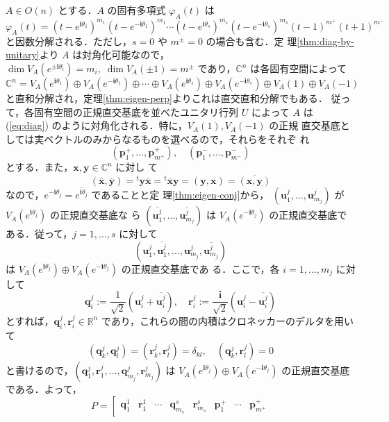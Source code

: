\documentclass[11pt, uplatex, dvipdfmx, titlepage]{jsarticle}
\makeatletter
\renewcommand{\i}{\mathbf{i}}
\renewcommand{\bar}[1]{\overline{#1}}
\renewenvironment{proof}[1][\proofname]{\par
  \pushQED{\qed}%
  \normalfont \topsep6\p@\@plus6\p@\relax
  \trivlist
  \item[\hskip\labelsep
         \bfseries
    {#1}]\ignorespaces
}{%
  \popQED\endtrivlist\@endpefalse
}
\theoremstyle{definition}
\renewcommand{\proofname}{\textbf{証明}}
\makeatother
\begin{document}
\begin{proof}[定理\ref{thm:stdform}の証明]
  $A \in O(n)$ とする．$A$ の固有多項式 $\varphi_A(t)$ は
\[
  \varphi_A(t) =(t-e^{\i
    \theta_1})^{m_1}(t-e^{-\i\theta_1})^{m_1} \cdots (t-e^{\i \theta_s})^{m_s}(t-e^{-\i
    \theta_s})^{m_s}(t-1)^{m^{+}} (t+1)^{m^{-}} 
\]
と因数分解される．ただし，$s=0$ や $m^{\pm}=0$ の場合も含む．定
理\ref{thm:diag-by-unitary}より $A$
は対角化可能なので，$\dim V_A(e^{ \pm \i
  \theta_i}) = m_i, \; \dim V_A(\pm 1) = m^{\pm}$ であり，$\mathbb{C}^{n}$ は各固有空間によって
\[
  \mathbb{C}^n = V_A(e^{\i \theta_1}) \oplus  V_A(e^{-\i\theta_1}) \oplus \cdots \oplus
  V_A(e^{\i\theta_s}) \oplus V_A(e^{-\i \theta_s}) \oplus V_A(1) \oplus V_A(-1) 
\]
と直和分解され，定理\ref{thm:eigen-perp}よりこれは直交直和分解でもある．
従って，各固有空間の正規直交基底を並べたユニタリ行列 $U$ によって $A$
は (\ref{eq:diag}) のように対角化される．特に，$V_A(1), V_A(-1)$ の正規
直交基底としては実ベクトルのみからなるものを選べるので，それらをそれぞ
れ
\[
  \left(\bm{p}^{+}_1, \ldots, \bm{p}^{+}_{m^{+}} \right), \quad \left(
      \bm{p}_1^{-}, \ldots, \bm{p}^{-}_{m^{-}}\right)
\]
とする．また，$\bm{x}, \bm{y} \in \mathbb{C}^n$ に対し
て
\[
  \left(\bar{\bm{x}}, \bar{\bm{y}}\right) = {}^{t}\bm{y} \bar{\bm{x}} =
  {}^{t}\bar{\bm{x}} \bm{y} = (\bm{y}, \bm{x}) =\bar{(\bm{x}, \bm{y})}
\]
なので，$e^{-\i\theta_j} = \bar{e^{\i\theta_j}}$ であることと定
理\ref{thm:eigen-conj}から， $(\bm{u}^j_1, \ldots,
\bm{u}^j_{m_j})$ が $V_A(e^{\i \theta_j})$ の正規直交基底な
ら $(\bar{\bm{u}^j_1}, \ldots, \bar{\bm{u}^j_{m_j}})$ は
$V_A(e^{-\i \theta_j})$
の正規直交基底である．従って，$j=1, \ldots, s$ に対して
\[
  ( \bm{u}^j_1, \bar{\bm{u}^j_1}, \ldots,
  \bm{u}^j_{m_j}, \bar{\bm{u}^{j}_{m_j}}) 
\]
は $V_A(e^{\i \theta_j}) \oplus V_A(e^{-\i \theta_j})$ の正規直交基底であ
る．ここで，各 $i=1,\ldots, m_j$ に対して
\[
  \bm{q}^j_{i} := \frac{1}{\sqrt{2}}\left( \bm{u}^j_i + \bar{\bm{u}^j_i}\right), \quad
  \bm{r}^{j}_{i}:=\frac{\i}{\sqrt{2}}\left( \bm{u}^j_i - \bar{\bm{u}^j_i}\right)
\]
とすれば，$\bm{q}^j_i, \bm{r}^j_i \in \mathbb{R}^n$ であり，これらの間の内積はクロネッカーのデルタを用いて
\[
  (\bm{q}^j_k, \bm{q}^j_l) = (\bm{r}^j_k, \bm{r}^j_l)=\delta_{kl}, \quad (\bm{q}^j_k, \bm{r}^j_l) = 0
\]
と書けるので，$(\bm{q}^j_1, \bm{r}^j_1, \ldots, \bm{q}^j_{m_j},
\bm{r}^j_{m_j})$ は $V_A(e^{\i\theta_j}) \oplus V_A(e^{-\i\theta_j})$
の正規直交基底である．よって，
\[
  P=\left[
    \begin{array}{ccccccccccc}
      \bm{q}^1_1 & \bm{r}^1_1 & \cdots & \bm{q}^s_{m_s} & \bm{r}^s_{m_s} & \bm{p}^{+}_1 & \cdots & \bm{p}^{+}_{m^+}

\end{array}\]
\end{proof}
\end{document}
